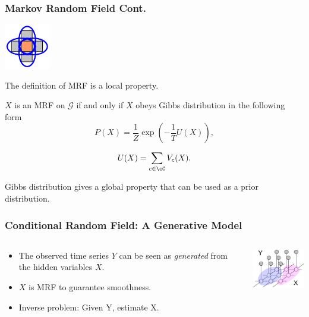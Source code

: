 \documentclass[serif]{beamer}
\begin{document}
\begin{frame}
\frametitle{Markov Random Field Cont.}
\hfill       \includegraphics[width=0.15\textwidth]{sfig/clique_1}

The definition of MRF is a local property. 
\begin{theorem}
  $X$ is an MRF on $\mathcal{G}$ if and only if $X$ obeys Gibbs distribution in
  the following form
  \begin{equation*}
    P(X) = \frac{1}{Z}\exp \left( -\frac{1}{T} U(X) \right),
  \end{equation*}

  \begin{equation*}
    U(X) = \sum_{c\in \cC} V_c(X).
  \end{equation*}
\end{theorem}

Gibbs distribution gives a global property that can be used as a prior
distribution.
\end{frame}
\begin{frame}
  \frametitle{Conditional Random Field: A Generative Model}
  \begin{columns}
    \begin{column}{7cm}
      \begin{block}{}
        \begin{itemize}
          \item The observed time series $Y$ can be seen as \emph{generated} from the
            hidden variables $X$.
          \item $X$ is MRF to guarantee smoothness.
          \item Inverse problem: Given Y, estimate X.
        \end{itemize}
      \end{block}
    \end{column}

    \begin{column}{3cm}
      \includegraphics[width=3cm]{sfig/condmrf2a}
    \end{column}
      
  \end{columns}

\end{frame}
\end{document}
